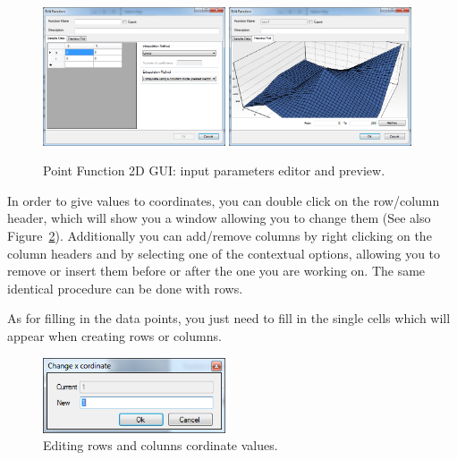 \begin{figure}[ht]
\begin{center}
\includegraphics[width=0.48\textwidth]{./images/PFunction2DEdit.png}
\includegraphics[width=0.48\textwidth]{./images/PFunction2DPreview.png}
\caption{Point Function 2D GUI: input parameters editor and preview.}
\label{fig.PFunction2DGUI}
\end{center}
\end{figure}

In order to give values to coordinates, you can double click on the row/column header, which will show you a window allowing you to change them (See also Figure~\ref{fig.PFunction2DColumnEdit}). Additionally you can add/remove columns by right clicking on the column headers and by selecting one of the contextual options, allowing you to remove or insert them before or after the one you are working on. The same identical procedure can be done with rows.

As for filling in the data points, you just need to fill in the single cells which will appear when creating rows or columns.

\begin{figure}[ht]
\begin{center}
\includegraphics[width=0.48\textwidth]{./images/PFunction2DColumnEdit.png}
\caption{Editing rows and colunns cordinate values.}
\label{fig.PFunction2DColumnEdit}
\end{center}
\end{figure}

